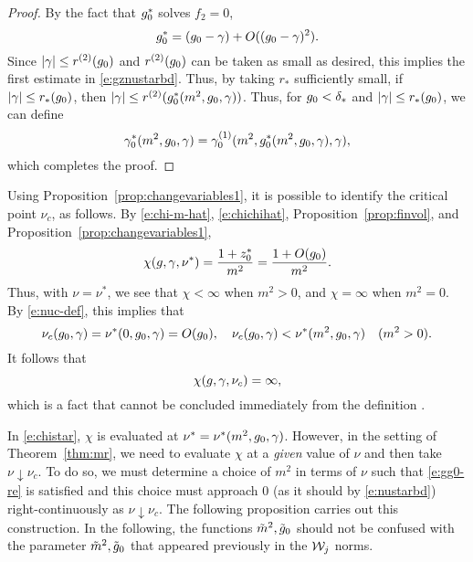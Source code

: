 \begin{proof}
By the fact that $g_0^*$ solves $f_2 = 0$,
\begin{equation}
g_0^* = (g_0 - \gamma) + O((g_0 - \gamma)^2).
\end{equation}
Since $|\gamma| \le r^{(2)}(g_0)$ and $r^{(2)}(g_0)$ can be taken
as small as desired, this implies the first estimate in \eqref{e:gznustarbd}.
Thus, by taking $r_*$ sufficiently small, if $|\gamma| \le r_*(g_0)$, then
$|\gamma| \le r^{(2)}(g_0^*(m^2, g_0, \gamma))$.
Thus, for $g_0 < \delta_*$ and $|\gamma| \leq r_*(g_0)$,
we can define
\begin{equation}
\gamma_0^*(m^2, g_0, \gamma) = \gamma^{(1)}_0(m^2, g_0^*(m^2, g_0, \gamma), \gamma),
\end{equation}
which completes the proof.
\end{proof}

Using Proposition~\ref{prop:changevariables1}, it is possible to
identify the critical point $\nu_c$, as follows.
By \eqref{e:chi-m-hat}, \eqref{e:chichihat}, Proposition~\ref{prop:finvol}, and Proposition~\ref{prop:changevariables1},
\begin{equation}
\label{e:chistar}
\chi(g, \gamma, \nu^*) = \frac{1 + z_0^*}{m^2} = \frac{1 + O(g_0)}{m^2}.
\end{equation}
Thus, with $\nu = \nu^*$, we see that $\chi < \infty$ when $m^2 > 0$, and
$\chi = \infty$ when $m^2 = 0$.
By \eqref{e:nuc-def}, this implies that
\begin{equation}
\label{e:nustarbd}
\nu_c(g_0, \gamma) = \nu^*(0, g_0, \gamma) = O(g_0),
	\quad
\nu_c(g_0, \gamma) < \nu^*(m^2, g_0, \gamma)
	\quad
(m^2 > 0).
\end{equation}
It follows that
\begin{equation}
\chi(g, \gamma, \nu_c) = \infty,
\end{equation}
which is a fact that cannot be concluded immediately from the definition .

In \eqref{e:chistar}, $\chi$ is evaluated at $\nu^* = \nu^*(m^2, g_0, \gamma)$.
However, in the setting of Theorem~\ref{thm:mr},
we need to evaluate $\chi$ at a \emph{given} value of $\nu$
and then take $\nu \downarrow \nu_c$.
To do so, we must determine a choice of $m^2$ in terms of $\nu$
such that \eqref{e:gg0-re} is satisfied and this choice
must approach $0$ (as it should by \eqref{e:nustarbd})
right-continuously as $\nu\downarrow\nu_c$.
The following proposition carries out this construction.
In the following, the functions $\tilde m^2, \tilde {g}_0$ should not be
confused with the parameter $\tilde{m}^2, \tilde{g}_0$ that appeared previously
in the $\mathcal{W}_j$ norms.

